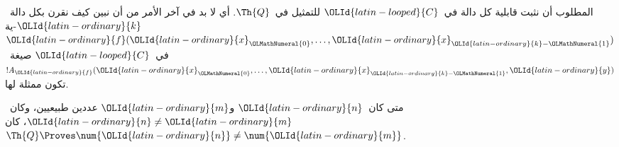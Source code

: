 \documentclass[../../../include/open-logic-section]{subfiles}
\begin{document}

المطلوب أن نثبت قابلية كل دالة في~${\OLId{latin-looped}{C}}$ للتمثيل في~$\Th{Q}$. أي لا بد في
آخر الأمر من أن نبين كيف نقرن بكل دالة~${\OLId{latin-ordinary}{k}}$-ية
${\OLId{latin-ordinary}{f}}({\OLId{latin-ordinary}{x}}_{\OLMathNumeral{0}},\dots,{\OLId{latin-ordinary}{x}}_{{\OLId{latin-ordinary}{k}}-{\OLMathNumeral{1}}})$ في~${\OLId{latin-looped}{C}}$ صيغة~$!A_{\OLId{latin-ordinary}{f}}({\OLId{latin-ordinary}{x}}_{\OLMathNumeral{0}},\dots,{\OLId{latin-ordinary}{x}}_{{\OLId{latin-ordinary}{k}}-{\OLMathNumeral{1}}},{\OLId{latin-ordinary}{y}})$ تكون
ممثلة لها.

\begin{lem}
متى كان~${\OLId{latin-ordinary}{n}}$ و${\OLId{latin-ordinary}{m}}$ عددين طبيعيين، وكان~${\OLId{latin-ordinary}{n}} \neq {\OLId{latin-ordinary}{m}}$، كان
$\Th{Q} \Proves \num {\OLId{latin-ordinary}{n}} \neq \num {\OLId{latin-ordinary}{m}}$.
\end{lem}
\end{document}
